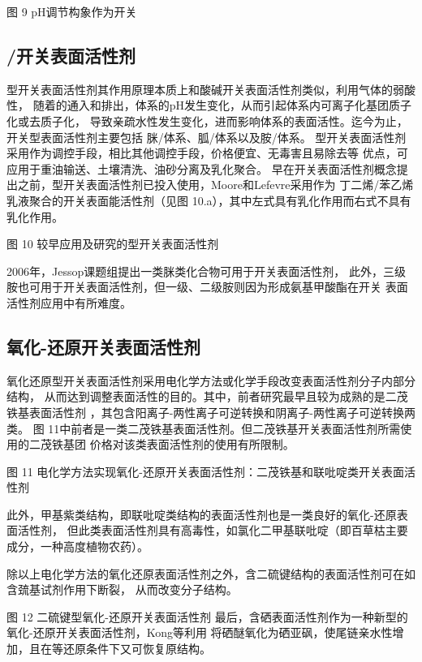 \documentclass[bachelor,winfonts]{jnuthesis} %
\begin{document}
    图 9 pH调节构象作为开关
    \subsection{/开关表面活性剂}
    型开关表面活性剂其作用原理本质上和酸碱开关表面活性剂类似，利用气体的弱酸性，
    随着的通入和排出，体系的pH发生变化，从而引起体系内可离子化基团质子化或去质子化，
    导致亲疏水性发生变化，进而影响体系的表面活性。迄今为止，开关型表面活性剂主要包括
    脒/体系、胍/体系以及胺/体系\cite{梅平2016}。
    型开关表面活性剂采用作为调控手段，相比其他调控手段，价格便宜、无毒害且易除去等
    优点\cite{jessop2012}，可应用于重油输送、土壤清洗、油砂分离及乳化聚合\cite{jessop2012}。
    早在开关表面活性剂概念提出之前，型开关表面活性剂已投入使用，Moore和Lefevre采用作为
    丁二烯/苯乙烯乳液聚合的开关表面能活性剂（见图 10.a），其中左式具有乳化作用而右式不具有乳化作用。
    
    图 10 较早应用及研究的型开关表面活性剂
    
    2006年，Jessop课题组\cite{liu2006science}提出一类脒类化合物可用于开关表面活性剂，
    此外，三级胺也可用于开关表面活性剂，但一级、二级胺则因为形成氨基甲酸酯在开关
    表面活性剂应用中有所难度\cite{jessop2012}。
    \subsection{氧化-还原开关表面活性剂}
    氧化还原型开关表面活性剂采用电化学方法或化学手段改变表面活性剂分子内部分结构，
    从而达到调整表面活性的目的。其中，前者研究最早且较为成熟的是二茂铁基表面活性剂
    ，其包含阳离子-两性离子可逆转换和阴离子-两性离子可逆转换两类\cite{李云霞2011}。
    图 11中前者是一类二茂铁基表面活性剂。但二茂铁基开关表面活性剂所需使用的二茂铁基团
    价格对该类表面活性剂的使用有所限制。
    
    图 11 电化学方法实现氧化-还原开关表面活性剂：二茂铁基和联吡啶类开关表面活性剂
    
    此外，甲基紫类结构，即联吡啶类结构的表面活性剂也是一类良好的氧化-还原表面活性剂，
    但此类表面活性剂具有高毒性，如氯化二甲基联吡啶（即百草枯主要成分，一种高度植物农药）。
    
    除以上电化学方法的氧化还原表面活性剂之外，含二硫键结构的表面活性剂可在如含巯基试剂作用下断裂，
    从而改变分子结构。
    
    图 12 二硫键型氧化-还原开关表面活性剂
    最后，含硒表面活性剂作为一种新型的氧化-还原开关表面活性剂，Kong等\cite{kong2016redox}利用
    将硒醚氧化为硒亚砜，使尾链亲水性增加，且在等还原条件下又可恢复原结构。
    
\end{document}

